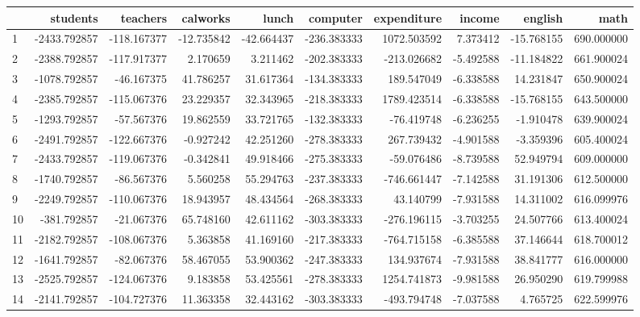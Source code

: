 \begin{tabular}{lrrrrrrrrr}
\toprule
{} &      students &     teachers &   calworks &      lunch &     computer &  expenditure &     income &    english &        math \\
\midrule
1   &  -2433.792857 &  -118.167377 & -12.735842 & -42.664437 &  -236.383333 &  1072.503592 &   7.373412 & -15.768155 &  690.000000 \\
2   &  -2388.792857 &  -117.917377 &   2.170659 &   3.211462 &  -202.383333 &  -213.026682 &  -5.492588 & -11.184822 &  661.900024 \\
3   &  -1078.792857 &   -46.167375 &  41.786257 &  31.617364 &  -134.383333 &   189.547049 &  -6.338588 &  14.231847 &  650.900024 \\
4   &  -2385.792857 &  -115.067376 &  23.229357 &  32.343965 &  -218.383333 &  1789.423514 &  -6.338588 & -15.768155 &  643.500000 \\
5   &  -1293.792857 &   -57.567376 &  19.862559 &  33.721765 &  -132.383333 &   -76.419748 &  -6.236255 &  -1.910478 &  639.900024 \\
6   &  -2491.792857 &  -122.667376 &  -0.927242 &  42.251260 &  -278.383333 &   267.739432 &  -4.901588 &  -3.359396 &  605.400024 \\
7   &  -2433.792857 &  -119.067376 &  -0.342841 &  49.918466 &  -275.383333 &   -59.076486 &  -8.739588 &  52.949794 &  609.000000 \\
8   &  -1740.792857 &   -86.567376 &   5.560258 &  55.294763 &  -237.383333 &  -746.661447 &  -7.142588 &  31.191306 &  612.500000 \\
9   &  -2249.792857 &  -110.067376 &  18.943957 &  48.434564 &  -268.383333 &    43.140799 &  -7.931588 &  14.311002 &  616.099976 \\
10  &   -381.792857 &   -21.067376 &  65.748160 &  42.611162 &  -303.383333 &  -276.196115 &  -3.703255 &  24.507766 &  613.400024 \\
11  &  -2182.792857 &  -108.067376 &   5.363858 &  41.169160 &  -217.383333 &  -764.715158 &  -6.385588 &  37.146644 &  618.700012 \\
12  &  -1641.792857 &   -82.067376 &  58.467055 &  53.900362 &  -247.383333 &   134.937674 &  -7.931588 &  38.841777 &  616.000000 \\
13  &  -2525.792857 &  -124.067376 &   9.183858 &  53.425561 &  -278.383333 &  1254.741873 &  -9.981588 &  26.950290 &  619.799988 \\
14  &  -2141.792857 &  -104.727376 &  11.363358 &  32.443162 &  -303.383333 &  -493.794748 &  -7.037588 &   4.765725 &  622.599976 \\

\end{tabular}
